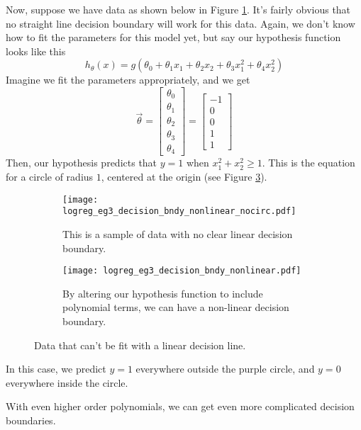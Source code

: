 Now, suppose we have data as shown below in Figure \ref{logreg_eg3_decision_bndy_nonlinear_nocirc.pdf}. It's fairly obvious that no straight line decision boundary will work for this data. Again, we don't know how to fit the parameters for this model yet, but say our hypothesis function looks like this
$$
h_\theta\left(x\right) = g\left(\theta_0 + \theta_1x_1 + \theta_2x_2 + \theta_3x_1^2 + \theta_4x_2^2\right)
$$
Imagine we fit the parameters appropriately, and we get
$$
\vec{\theta} = \left[\begin{array}{c} \theta_0 \\ \theta_1 \\ \theta_2 \\ \theta_3 \\ \theta_4 \end{array}\right] = \left[\begin{array}{c}-1 \\ 0 \\ 0 \\ 1 \\ 1 \end{array}\right]
$$
Then, our hypothesis predicts that $y=1$ when $x_1^2 + x_2^2 \geq 1$. This is the equation for a circle of radius $1$, centered at the origin (see Figure \ref{logreg_eg3_decision_bndy_nonlinear.pdf}).
\begin{figure}[h]
	\centering
	\begin{subfigure}[t]{0.45\textwidth}
   		\centering
    		\graphicspath{{./Figures/}}
  		\texttt{[image: logreg\_eg3\_decision\_bndy\_nonlinear\_nocirc.pdf]} 
   		\caption[]{This is a sample of data with no clear linear decision boundary.}
   		\label{logreg_eg3_decision_bndy_nonlinear_nocirc.pdf}
	\end{subfigure}
	\begin{subfigure}[t]{0.45\textwidth}
   		\centering
    		\graphicspath{{./Figures/}}
   		\texttt{[image: logreg\_eg3\_decision\_bndy\_nonlinear.pdf]} 
   		\caption[]{By altering our hypothesis function to include polynomial terms, we can have a non-linear decision boundary.}
   		\label{logreg_eg3_decision_bndy_nonlinear.pdf}
	\end{subfigure}
	\caption[]{Data that can't be fit with a linear decision line.}
\end{figure}
In this case, we predict $y=1$ everywhere outside the purple circle, and $y=0$ everywhere inside the circle. 

With even higher order polynomials, we can get even more complicated decision boundaries. 


